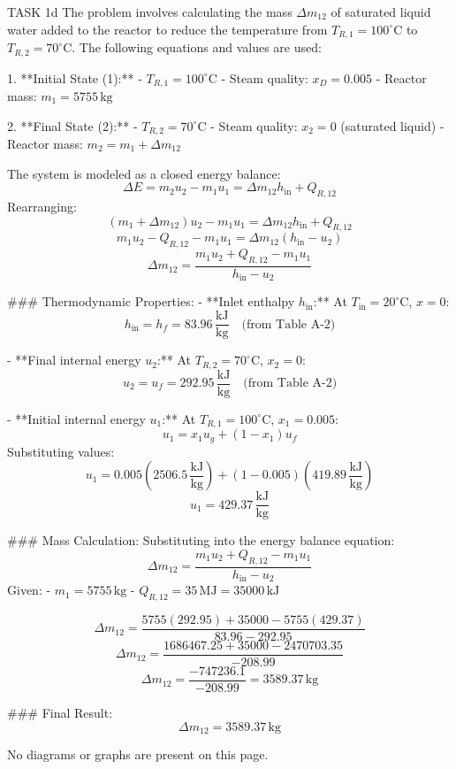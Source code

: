 TASK 1d  
The problem involves calculating the mass \( \Delta m_{12} \) of saturated liquid water added to the reactor to reduce the temperature from \( T_{R,1} = 100^\circ\text{C} \) to \( T_{R,2} = 70^\circ\text{C} \). The following equations and values are used:

1. **Initial State (1):**  
   - \( T_{R,1} = 100^\circ\text{C} \)  
   - Steam quality: \( x_D = 0.005 \)  
   - Reactor mass: \( m_1 = 5755 \, \text{kg} \)  

2. **Final State (2):**  
   - \( T_{R,2} = 70^\circ\text{C} \)  
   - Steam quality: \( x_2 = 0 \) (saturated liquid)  
   - Reactor mass: \( m_2 = m_1 + \Delta m_{12} \)  

The system is modeled as a closed energy balance:  
\[
\Delta E = m_2 u_2 - m_1 u_1 = \Delta m_{12} h_{\text{in}} + Q_{R,12}
\]  
Rearranging:  
\[
(m_1 + \Delta m_{12}) u_2 - m_1 u_1 = \Delta m_{12} h_{\text{in}} + Q_{R,12}
\]  
\[
m_1 u_2 - Q_{R,12} - m_1 u_1 = \Delta m_{12} (h_{\text{in}} - u_2)
\]  
\[
\Delta m_{12} = \frac{m_1 u_2 + Q_{R,12} - m_1 u_1}{h_{\text{in}} - u_2}
\]

### Thermodynamic Properties:
- **Inlet enthalpy \( h_{\text{in}} \):**  
  At \( T_{\text{in}} = 20^\circ\text{C} \), \( x = 0 \):  
  \[
  h_{\text{in}} = h_f = 83.96 \, \frac{\text{kJ}}{\text{kg}} \quad \text{(from Table A-2)}
  \]

- **Final internal energy \( u_2 \):**  
  At \( T_{R,2} = 70^\circ\text{C} \), \( x_2 = 0 \):  
  \[
  u_2 = u_f = 292.95 \, \frac{\text{kJ}}{\text{kg}} \quad \text{(from Table A-2)}
  \]

- **Initial internal energy \( u_1 \):**  
  At \( T_{R,1} = 100^\circ\text{C} \), \( x_1 = 0.005 \):  
  \[
  u_1 = x_1 u_g + (1 - x_1) u_f  
  \]  
  Substituting values:  
  \[
  u_1 = 0.005 (2506.5 \, \frac{\text{kJ}}{\text{kg}}) + (1 - 0.005)(419.89 \, \frac{\text{kJ}}{\text{kg}})  
  \]  
  \[
  u_1 = 429.37 \, \frac{\text{kJ}}{\text{kg}}
  \]

### Mass Calculation:
Substituting into the energy balance equation:  
\[
\Delta m_{12} = \frac{m_1 u_2 + Q_{R,12} - m_1 u_1}{h_{\text{in}} - u_2}
\]  
Given:  
- \( m_1 = 5755 \, \text{kg} \)  
- \( Q_{R,12} = 35 \, \text{MJ} = 35000 \, \text{kJ} \)  

\[
\Delta m_{12} = \frac{5755 (292.95) + 35000 - 5755 (429.37)}{83.96 - 292.95}
\]  
\[
\Delta m_{12} = \frac{1686467.25 + 35000 - 2470703.35}{-208.99}
\]  
\[
\Delta m_{12} = \frac{-747236.1}{-208.99} = 3589.37 \, \text{kg}
\]

### Final Result:
\[
\Delta m_{12} = 3589.37 \, \text{kg}
\]  

No diagrams or graphs are present on this page.